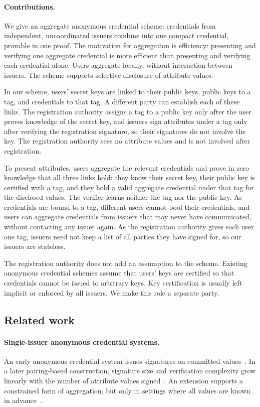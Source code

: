 \paragraph{Contributions.} We give an aggregate anonymous credential scheme:
credentials from independent, uncoordinated issuers combine into one compact
credential, provable in one proof. The motivation for aggregation is efficiency: presenting
and verifying one aggregate credential is more efficient than presenting and verifying
each credential alone. Users aggregate locally, without interaction
between issuers. The scheme supports selective disclosure
of attribute values.

In our scheme, users' secret keys are linked to their public keys, public keys
to a tag, and credentials to that tag. A different party can establish each of
these links.
The registration authority assigns a tag to a public key only after the user
proves knowledge of the secret key, and issuers sign attributes under a tag
only after verifying the registration signature, so their signatures do not
involve the key. The registration authority sees no attribute values and is not
involved after registration.

To present attributes, users aggregate the relevant credentials and prove in
zero knowledge that all three links hold: they know their secret key, their
public key is certified with a tag, and they hold a valid aggregate credential
under that tag for the disclosed values. The verifier learns neither the tag
nor the public key. As credentials are bound to a tag, different users cannot pool
their credentials, and users can aggregate credentials from issuers that may
never have communicated, without contacting any issuer again. As the
registration authority gives each user one tag, issuers need not keep a list of
all parties they have signed for, so our issuers are stateless.

The registration authority does not add an assumption to the scheme. Existing anonymous credential schemes assume that users' keys are
certified so that credentials cannot be issued to arbitrary keys. Key
certification is usually left implicit or enforced by all issuers. We make this
role a separate party.

\subsection*{Related work}

\paragraph{Single-issuer anonymous credential systems.} An early anonymous
credential system issues signatures on committed
values~\cite{EC:CamLys01,SCN:CamLys02}. In a later pairing-based construction,
signature size and verification complexity grow linearly with the number of
attribute values signed~\cite{C:CamLys04}. An extension supports a constrained
form of aggregation, but only in settings where all values are known in
advance~\cite{FC:LeeLeeYun13}.

